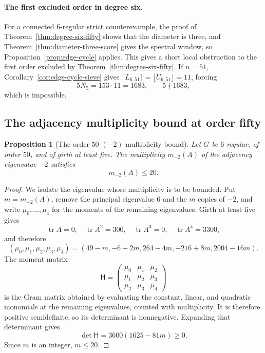 \documentclass[a4paper,10pt,reqno]{amsart}
\theoremstyle{plain}
\newtheorem{proposition}[theorem]{Proposition}
\theoremstyle{definition}
\theoremstyle{remark}
\newcommand{\tr}{\operatorname{tr}}
\begin{document}
\paragraph{The first excluded order in degree six.}
For a connected \(6\)-regular strict counterexample, the proof of
Theorem~\ref{thm:degree-six-fifty} shows that the diameter is three, and
Theorem~\ref{thm:diameter-three-score} gives the spectral window, so
Proposition~\ref{prop:edge-cycle} applies. This gives a short local
obstruction to the first order excluded by
Theorem~\ref{thm:degree-six-fifty}.
If \(n=51\), Corollary~\ref{cor:edge-cycle-sieve} gives
\(\lceil L_{6,51}\rceil=\lfloor U_{6,51}\rfloor=11\), forcing
\[
 5N_5=153\cdot11=1683,
 \qquad 5\nmid 1683,
\]
which is impossible.

\subsection{The adjacency multiplicity bound at order fifty}

\begin{proposition}[The order-\(50\) \((-2)\)-multiplicity bound]
\label{prop:order50-minus-two}
Let \(G\) be \(6\)-regular, of order \(50\), and of girth at least five.
The multiplicity \(m_{-2}(A)\) of the adjacency eigenvalue \(-2\) satisfies
\[
 m_{-2}(A)\le20.
\]
\end{proposition}

\begin{proof}
We isolate the eigenvalue whose multiplicity is to be bounded.  Put
\(m=m_{-2}(A)\), remove the principal eigenvalue \(6\) and the \(m\)
copies of \(-2\), and write \(\mu_0,\ldots,\mu_4\) for the moments of
the remaining eigenvalues.  Girth at least five gives
\[
 \tr A=0,\quad \tr A^2=300,\quad \tr A^3=0,\quad \tr A^4=3300,
\]
and therefore
\[
 (\mu_0,\mu_1,\mu_2,\mu_3,\mu_4)
 =(49-m,-6+2m,264-4m,-216+8m,2004-16m).
\]
The moment matrix
\[
 \mathsf H=\begin{pmatrix}
 \mu_0&\mu_1&\mu_2\\
 \mu_1&\mu_2&\mu_3\\
 \mu_2&\mu_3&\mu_4
 \end{pmatrix}
\]
is the Gram matrix obtained by evaluating the constant, linear, and
quadratic monomials at the remaining eigenvalues, counted with multiplicity.
It is therefore positive semidefinite, so its determinant is nonnegative.
Expanding that determinant gives
\[
 \det\mathsf H=3600(1625-81m)\ge0.
\]
Since \(m\) is an integer, \(m\le20\).
\end{proof}
\end{document}
